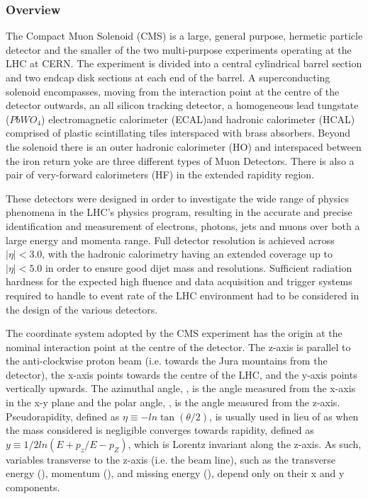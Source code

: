 \subsubsection{Overview}
The Compact Muon Solenoid (CMS) is a large, general purpose, hermetic particle detector and the smaller of the two multi-purpose experiments operating at the LHC at CERN.
The experiment is divided into a central cylindrical barrel section and two endcap disk sections at each end of the barrel.
A superconducting solenoid encompasses, moving from the interaction point at the centre of the detector outwards, an all silicon tracking detector, a homogeneous lead tungstate ($PbWO_{4}$) electromagnetic calorimeter (ECAL)and hadronic calorimeter (HCAL) comprised of plastic scintillating tiles interspaced with brass absorbers.
Beyond the solenoid there is an outer hadronic calorimeter (HO) and interspaced between the iron return yoke are three different types of Muon Detectors.
There is also a pair of very-forward calorimeters (HF) in the extended rapidity region\cite{oldcms}.

These detectors were designed in order to investigate the wide range of physics phenomena in the LHC's physics program, resulting in the accurate and precise identification and measurement of electrons, photons, jets and muons over both a large energy and momenta range.
Full detector resolution is achieved across $|\eta| < 3.0$, with the hadronic calorimetry having an extended coverage up to $|\eta| < 5.0$ in order to ensure good dijet mass and \MET resolutions.
Sufficient radiation hardness for the expected high fluence and data acquisition and trigger systems required to handle to event rate of the LHC environment had to be considered in the design of the various detectors.

The coordinate system adopted by the CMS experiment has the origin at the nominal interaction point at the centre of the detector. 
The z-axis is parallel to the anti-clockwise proton beam (i.e. towards the Jura mountains from the detector), the x-axis points towards the centre of the LHC, and the y-axis points vertically upwards.
The azimuthal angle, \phi, is the angle measured from the x-axis in the x-y plane and the polar angle, \theta, is the angle measured from the z-axis.
Pseudorapidity, defined as $\eta \equiv -ln\tan(\theta/2)$, is usually used in lieu of \theta as when the mass considered is negligible \eta converges towards rapidity, defined as $y \equiv	1/2 ln(E+p_{z}/E-p_{Z})$, which is Lorentz invariant along the z-axis.
As such, variables transverse to the z-axis (i.e. the beam line), such as the transverse energy (\ET), momentum (\pT), and missing energy (\MET), depend only on their x and y components.


